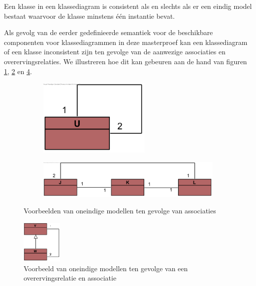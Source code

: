 Een klasse in een klassediagram is consistent als en slechts als er een eindig model bestaat waarvoor de klasse minstens \'e\'en instantie bevat.

Als gevolg van de eerder gedefinieerde semantiek voor de beschikbare componenten voor klassediagrammen in deze masterproef kan een klassediagram of een klasse inconsistent zijn ten gevolge van de aanwezige associaties en overervingsrelaties. We illustreren hoe dit kan gebeuren aan de hand van figuren \ref{fig:incon-assoc-simple}, \ref{fig:incon-assoc-multi} en \ref{fig:incon-gen-assoc}.

\begin{figure}
	\hspace{-3cm}
	\centering
	\begin{subfigure}[b]{0.3\textwidth}
		\includegraphics[width=0.6\textwidth]{chap-consistentie/voorbeeld3.png}
		\caption{}
		\label{fig:incon-assoc-simple}
	\end{subfigure}%
	\begin{subfigure}[b]{0.3\textwidth}
		\includegraphics[width=2\textwidth]{chap-consistentie/voorbeeld4.png}
		\caption{}
		\label{fig:incon-assoc-multi}
	\end{subfigure}
	\caption{Voorbeelden van oneindige modellen ten gevolge van associaties}
	\label{fig:incon-assoc}
\end{figure}

\begin{figure}
	\centering
	\includegraphics[width=0.175\textwidth]{chap-consistentie/voorbeeld5.png}
	\caption{Voorbeeld van oneindige modellen ten gevolge van een overervingsrelatie en associatie}
	\label{fig:incon-gen-assoc}
\end{figure}

